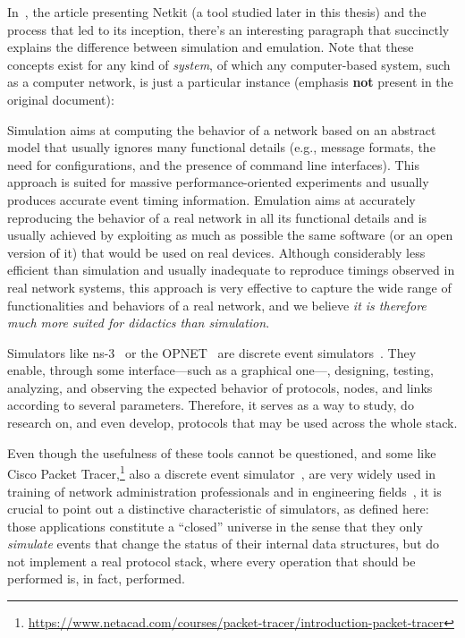 

In~\cite{netkit-full}, the article presenting Netkit (a tool studied later in this thesis) and the process that led to its inception, there's an interesting paragraph that succinctly explains the difference between simulation and emulation.
Note that these concepts exist for any kind of \emph{system}, of which any computer-based system, such as a computer network, is just a particular instance (emphasis \textbf{not} present in the original document):
\begin{displayquote}
Simulation aims at computing the behavior of a network based on an abstract model that usually ignores many functional details (e.g., message formats, the need for configurations, and the presence of command line interfaces).
This approach is suited for massive performance-oriented experiments and usually produces accurate event timing information.
Emulation aims at accurately reproducing the behavior of a real network in all its functional details and is usually achieved by exploiting as much as possible the same software (or an open version of it) that would be used on real devices.
Although considerably less efficient than simulation and usually inadequate to reproduce timings observed in real network systems, this approach is very effective to capture the wide range of functionalities and behaviors of a real network, and we believe \emph{it is therefore much more suited for didactics than simulation}.
\end{displayquote}
Simulators like ns-3~\cite{ns3} or the OPNET~\cite{introtoopnet} are discrete event simulators~\cite{netsimoremu}.
They enable, through some interface---such as a graphical one---, designing, testing, analyzing, and observing the expected behavior of protocols, nodes, and links according to several parameters. Therefore, it serves as a way to study, do research on, and even develop, protocols that may be used across the whole stack.

Even though the usefulness of these tools cannot be questioned, and some like Cisco Packet Tracer,\footnote{\url{https://www.netacad.com/courses/packet-tracer/introduction-packet-tracer}} also a discrete event simulator~\cite{evaluatingnetsimmethodologicapproach}, are very widely used in training of network administration professionals and in engineering fields~\cite{rolepackettracer}, it is crucial to point out a distinctive characteristic of simulators, as defined here: those applications constitute a ``closed'' universe in the sense that they only \emph{simulate} events that change the status of their internal data structures, but do not implement a real protocol stack, where every operation that should be performed is, in fact, performed.

